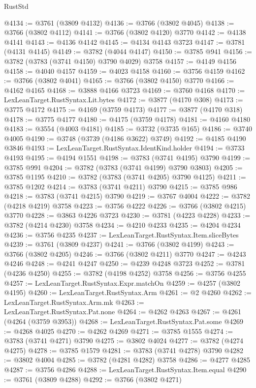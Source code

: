 \begin{lexlean}{RustStd}
\begin{coremodule}
@4134 := @3761 (@3809 @4132)
@4136 := @3766 (@3802 @4045)
@4138 := @3766 (@3802 @4112)
@4141 := @3766 (@3802 @4120) @3770
@4142 := @4138 @4141
@4143 := @4136 @4142
@4145 := @4134 @4143 @3723
@4147 := @3781 (@4131 @4145)
@4149 := @3782 (@4044 @4147)
@4150 := @3785 @941
@4156 := @3782 (@3783 (@3741 @4150) @3790 @4029) @3758
@4157 := @4149 @4156
@4158 := @4040 @4157
@4159 := @4023 @4158
@4160 := @3756 @4159
@4162 := @3766 (@3802 @4041)
@4165 := @3766 (@3802 @4150) @3770
@4166 := @4162 @4165
@4168 := @3888 @4166 @3723
@4169 := @3760 @4168
@4170 := LexLeanTarget.RustSyntax.Lit.bytes
@4172 := @3877 (@4170 @308)
@4173 := @3775 @4172
@4175 := @4169 (@3759 @4173)
@4177 := @3877 (@4170 @318)
@4178 := @3775 @4177
@4180 := @4175 (@3759 @4178)
@4181 := @4160 @4180
@4183 := @3554 (@4003 @4181)
@4185 := @3732 (@3735 @165)
@4186 := @3740 @4005
@4190 := @3748 (@3739 (@4186 @3622) @3749)
@4192 := @4185 @4190 @3846
@4193 := LexLeanTarget.RustSyntax.IdentKind.holder
@4194 := @3733 @4193
@4195 := @4194 @1551
@4198 := @3783 (@3741 @4195) @3790
@4199 := @3785 @991
@4204 := @3782 (@3783 (@3741 @4199) @3790 @3803)
@4205 := @3785 @1195
@4210 := @3782 (@3783 (@3741 @4205) @3790 @4125)
@4211 := @3785 @1202
@4214 := @3783 (@3741 @4211) @3790
@4215 := @3785 @986
@4218 := @3783 (@3741 @4215) @3790
@4219 := @3767 @4004
@4222 := @3782 (@4218 @4219) @3758
@4223 := @3756 @4222
@4226 := @3766 (@3802 @4215) @3770
@4228 := @3863 @4226 @3723
@4230 := @3781 (@4223 @4228)
@4233 := @3782 (@4214 @4230) @3758
@4234 := @4210 @4233
@4235 := @4204 @4234
@4236 := @3756 @4235
@4237 := LexLeanTarget.RustSyntax.Item.sliceBytes
@4239 := @3761 (@3809 @4237)
@4241 := @3766 (@3802 @4199)
@4243 := @3766 (@3802 @4205)
@4246 := @3766 (@3802 @4211) @3770
@4247 := @4243 @4246
@4248 := @4241 @4247
@4250 := @4239 @4248 @3723
@4252 := @3781 (@4236 @4250)
@4255 := @3782 (@4198 @4252) @3758
@4256 := @3756 @4255
@4257 := LexLeanTarget.RustSyntax.Expr.matchOn
@4259 := @4257 (@3802 @4195)
@4260 := LexLeanTarget.RustSyntax.Arm
@4261 := @2 @4260
@4262 := LexLeanTarget.RustSyntax.Arm.mk
@4263 := LexLeanTarget.RustSyntax.Pat.none
@4264 := @4262 @4263
@4267 := @4261 (@4264 (@3759 @3953))
@4268 := LexLeanTarget.RustSyntax.Pat.some
@4269 := @4268 @4025
@4270 := @4262 @4269
@4271 := @3785 @1555
@4274 := @3783 (@3741 @4271) @3790
@4275 := @3802 @4024
@4277 := @3782 (@4274 @4275)
@4278 := @3785 @1579
@4281 := @3783 (@3741 @4278) @3790
@4282 := @3802 @4004
@4285 := @3782 (@4281 @4282) @3758
@4286 := @4277 @4285
@4287 := @3756 @4286
@4288 := LexLeanTarget.RustSyntax.Item.equal
@4290 := @3761 (@3809 @4288)
@4292 := @3766 (@3802 @4271)

\end{coremodule}
\end{lexlean}
